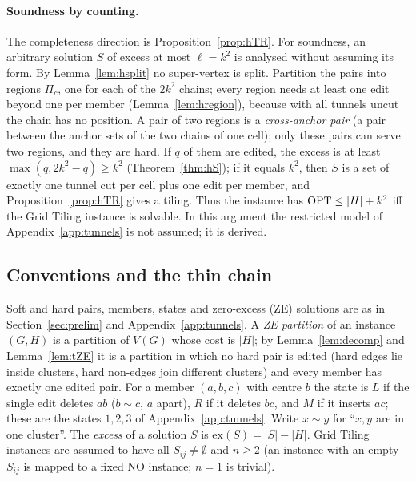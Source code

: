\paragraph{Soundness by counting.} The completeness direction is Proposition~\ref{prop:hTR}. For soundness, an arbitrary solution $S$ of excess at most $\ell=k^2$ is analysed without assuming its form. By Lemma~\ref{lem:hsplit} no super-vertex is split. Partition the pairs into regions $\Pi_c$, one for each of the $2k^2$ chains; every region needs at least one edit beyond one per member (Lemma~\ref{lem:hregion}), because with all tunnels uncut the chain has no position. A pair of two regions is a \emph{cross-anchor pair} (a pair between the anchor sets of the two chains of one cell); only these pairs can serve two regions, and they are hard. If $q$ of them are edited, the excess is at least $\max(q,2k^2-q)\ge k^2$ (Theorem~\ref{thm:hS}); if it equals $k^2$, then $S$ is a set of exactly one tunnel cut per cell plus one edit per member, and Proposition~\ref{prop:hTR} gives a tiling. Thus the instance has $\mathrm{OPT}\le|H|+k^2$ iff the Grid Tiling instance is solvable. In this argument the restricted model of Appendix~\ref{app:tunnels} is not assumed; it is derived.


\subsection{Conventions and the thin chain}\label{sec:hthin}\label{sec:hconv}
Soft and hard pairs, members, states and zero-excess (ZE) solutions are as in Section~\ref{sec:prelim} and Appendix~\ref{app:tunnels}. A \emph{ZE partition} of an instance $(G,H)$ is a partition of $V(G)$ whose cost is $|H|$; by Lemma~\ref{lem:decomp} and Lemma~\ref{lem:tZE} it is a partition in which no hard pair is edited (hard edges lie inside clusters, hard non-edges join different clusters) and every member has exactly one edited pair. For a member $(a,b,c)$ with centre $b$ the state is $L$ if the single edit deletes $ab$ ($b\sim c$, $a$ apart), $R$ if it deletes $bc$, and $M$ if it inserts $ac$; these are the states $1,2,3$ of Appendix~\ref{app:tunnels}. Write $x\sim y$ for ``$x,y$ are in one cluster''. The \emph{excess} of a solution $S$ is $\mathrm{ex}(S)=|S|-|H|$. Grid Tiling instances are assumed to have all $S_{ij}\ne\emptyset$ and $n\ge2$ (an instance with an empty $S_{ij}$ is mapped to a fixed NO instance; $n=1$ is trivial).

